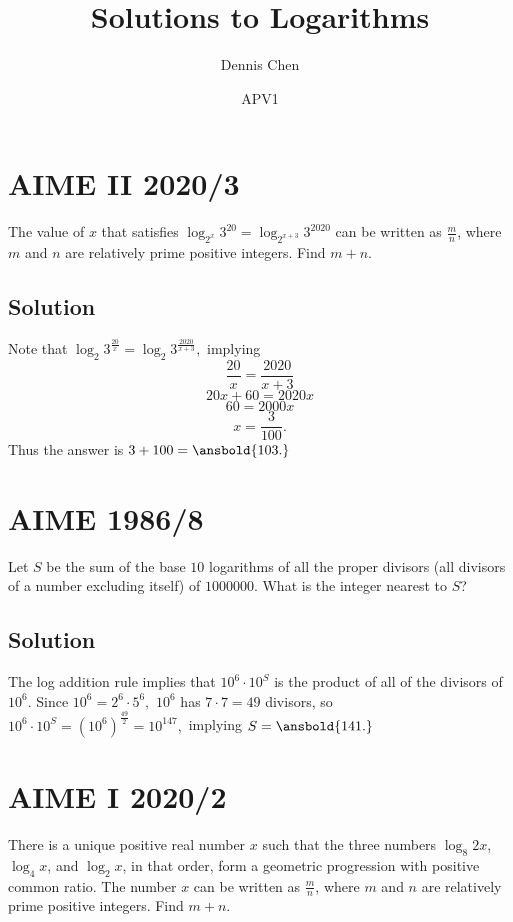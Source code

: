 \documentclass[mast]{lucky}
\title{Solutions to Logarithms}
\author{Dennis Chen}
\date{APV1}
\begin{document}
\maketitle

\toc

\pagebreak\section{AIME II 2020/3}

The value of $x$ that satisfies $\log_{2^x} 3^{20} = \log_{2^{x+3}} 3^{2020}$ can be written as $\frac{m}{n}$, where $m$ and $n$ are relatively prime positive integers. Find $m+n$.

\subsection{Solution}

Note that $\log_2{3}^\frac{20}{x}=\log_2{3}^\frac{2020}{x+3},$ implying
\[\frac{20}{x}=\frac{2020}{x+3}\]
\[20x+60=2020x\]
\[60=2000x\]
\[x=\frac{3}{100}.\]
Thus the answer is $3+100=\ansbold{103.}$

\pagebreak\section{AIME 1986/8}

Let $S$ be the sum of the base $10$ logarithms of all the proper divisors (all divisors of a number excluding itself) of $1000000$. What is the integer nearest to $S$?

\subsection{Solution}

The log addition rule implies that $10^6\cdot 10^S$ is the product of all of the divisors of $10^6.$ Since $10^6=2^6\cdot 5^6,$ $10^6$ has $7\cdot 7=49$ divisors, so $10^6\cdot 10^S=(10^6)^{\frac{49}{2}}=10^{147},$ implying $S=\ansbold{141.}$

\pagebreak\section{AIME I 2020/2}

There is a unique positive real number $x$ such that the three numbers $\log_8{2x}$, $\log_4{x}$, and $\log_2{x}$, in that order, form a geometric progression with positive common ratio. The number $x$ can be written as $\frac{m}{n}$, where $m$ and $n$ are relatively prime positive integers. Find $m + n$.
\end{document}
